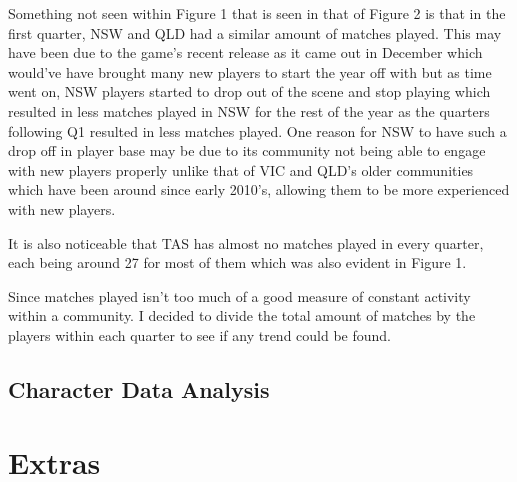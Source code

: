 \documentclass[11pt, oneside, a4paper]{article}
\begin{document}
Something not seen within Figure 1 that is seen in that of Figure 2 is that in the first quarter, NSW and QLD had a similar amount of matches played. This may have been due to the game's recent release as it came out in December which would've have brought many new players to start the year off with but as time went on, NSW players started to drop out of the scene and stop playing which resulted in less matches played in NSW for the rest of the year as the quarters following Q1 resulted in less matches played. One reason for NSW to have such a drop off in player base may be due to its community not being able to engage with new players properly unlike that of VIC and QLD's older communities which have been around since early 2010's, allowing them to be more experienced with new players.

It is also noticeable that TAS has almost no matches played in every quarter, each being around 27 for most of them which was also evident in Figure 1.

Since matches played isn't too much of a good measure of constant activity within a community. I decided to divide the total amount of matches by the players within each quarter to see if any trend could be found.

\subsection{Character Data Analysis}

\section{Extras}
\end{document}

